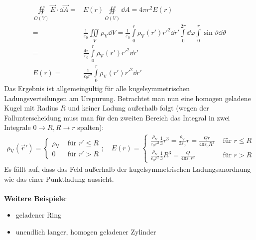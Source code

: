 			        \begin{equation}\begin{split}
			        		\oiint\limits_{O(V)}
			        		\vec{E} \cdot \dd\vec{A} = & E(r) \oiint\limits_{O(V)}
			        		\dd A = 4\pi r^2 E(r) \\
			        		= & \frac{1}{\varepsilon_0} \iiint\limits_{V}
			        		\rho_\text{V} \dd V =  \frac{1}{\varepsilon_0} \int\limits_0^r \rho_\text{V}(r') r'^2\dd r'
			        		\int\limits_0^{2\pi} \dd \varphi \int\limits_0^\pi \sin\vartheta
			        		\dd\vartheta \\
			        		= & \frac{4\pi}{\varepsilon_0}\int\limits_0^r \rho_\text{V}(r') r'^2\dd r'\\
			        		E(r) = & \frac{1}{\varepsilon_0 r^2} \int\limits_0^r \rho_\text{V}(r') r'^2\dd r'
			        \end{split}\end{equation}
			        Das Ergebnis ist allgemeingültig für alle kugelsymmetrischen Ladungsverteilungen am Urspurung. Betrachtet man nun eine homogen geladene Kugel mit Radius $R$ und keiner Ladung außerhalb folgt (wegen der Fallunterscheidung muss man für den zweiten Bereich das Integral in zwei Integrale $0\to R, R\to r$ spalten):
			        \begin{equation}\begin{split}
			        		\rho_\text{V} (\vec{r}' ) = \begin{cases}
			        			\rho_\text{V} & \text{ für } r' \le R \\
			        			0      & \text{ für } r' > R
			        		\end{cases};\quad E(r) =  \begin{cases}
			        			\frac{\rho_\text{V}}{\varepsilon_0r^2}\frac{1}{3}r^3 =
			        			\frac{\rho_\text{V}}{3\varepsilon_0}r= \frac{Q r}{4\pi\varepsilon_0 R^3}              & \text{ für } r \le R \\
			        			\frac{\rho_\text{V}}{\varepsilon_0r^2}\frac{1}{3}R^3 = \frac{Q}{4\pi\varepsilon_0r^2} & \text{ für } r > R
			        		\end{cases}
			        \end{split}\end{equation}
			        Es fällt auf, dass das Feld außerhalb der kugelsymmetrischen Ladungsanordnung wie das einer Punktladung aussieht.\\\\
			   \textbf{Weitere Beispiele}:
			        \begin{itemize}
				        \item geladener Ring
				        \item unendlich langer, homogen geladener Zylinder
			        \end{itemize}

